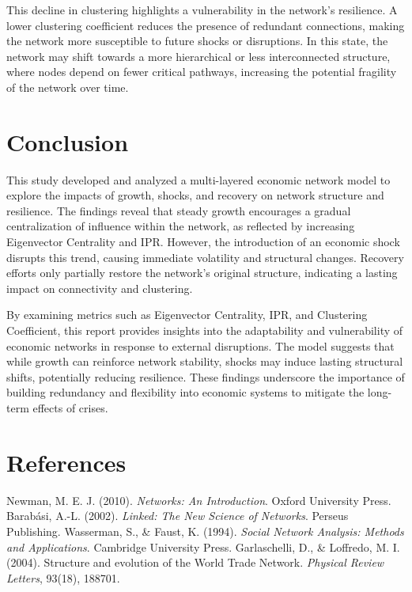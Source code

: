 \documentclass{article} %
\begin{document}
This decline in clustering highlights a vulnerability in the network's resilience. A lower clustering coefficient reduces the presence of redundant connections, making the network more susceptible to future shocks or disruptions. In this state, the network may shift towards a more hierarchical or less interconnected structure, where nodes depend on fewer critical pathways, increasing the potential fragility of the network over time.





\section{Conclusion}
This study developed and analyzed a multi-layered economic network model to explore the impacts of growth, shocks, and recovery on network structure and resilience. The findings reveal that steady growth encourages a gradual centralization of influence within the network, as reflected by increasing Eigenvector Centrality and IPR. However, the introduction of an economic shock disrupts this trend, causing immediate volatility and structural changes. Recovery efforts only partially restore the network's original structure, indicating a lasting impact on connectivity and clustering.

By examining metrics such as Eigenvector Centrality, IPR, and Clustering Coefficient, this report provides insights into the adaptability and vulnerability of economic networks in response to external disruptions. The model suggests that while growth can reinforce network stability, shocks may induce lasting structural shifts, potentially reducing resilience. These findings underscore the importance of building redundancy and flexibility into economic systems to mitigate the long-term effects of crises.

\section{References}
\begin{thebibliography}{99}
 Newman, M. E. J. (2010). \textit{Networks: An Introduction}. Oxford University Press.
 Barabási, A.-L. (2002). \textit{Linked: The New Science of Networks}. Perseus Publishing.
 Wasserman, S., \& Faust, K. (1994). \textit{Social Network Analysis: Methods and Applications}. Cambridge University Press.
 Garlaschelli, D., \& Loffredo, M. I. (2004). Structure and evolution of the World Trade Network. \textit{Physical Review Letters}, 93(18), 188701.
\end{thebibliography}
\end{document}

